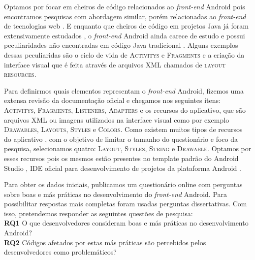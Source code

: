Optamos por focar em cheiros de código relacionados ao \textit{front-end} Android pois encontramos pesquisas com abordagem similar, por\'em relacionadas ao \textit{front-end} de tecnologias web \cite{CSSCodeSmell, BB, FinavaroAniche2016}. E enquanto que cheiros de c\'odigo em projetos Java j\'a foram extensivamente estudados \cite{Riel, Refactoring:99, Martin:2008:CCH:1388398}, o \textit{front-end} Android ainda carece de estudo e possui peculiaridades n\~ao encontradas em c\'odigo Java tradicional \cite{Mannan_Dig_Ahmed_Jensen_Abdullah_Almurshed}. Alguns exemplos dessas peculiaridas s\~ao o ciclo de vida de \textsc{Activitys} e \textsc{Fragments} e a cria\c{c}\~ao da interface visual que \'e feita atrav\'es de arquivos XML chamados de \textsc{layout resources}.

Para definirmos quais elementos representam o \textit{front-end} Android, fizemos uma extensa revis\~ao da documenta\c{c}\~ao oficial \cite{AndroidDeveloperSite2016} e chegamos nos seguintes itens: \textsc{Activitys}, \textsc{Fragments}, \textsc{Listeners}, \textsc{Adapters} e os recursos do aplicativo, que s\~ao arquivos XML ou imagens utilizados na interface visual como por exemplo \textsc{Drawables}, \textsc{Layouts}, \textsc{Styles} e \textsc{Colors}. Como existem muitos tipos de recursos do aplicativo \cite{AndroidResourcesOverview}, com o objetivo de limitar o tamanho do question\'ario e foco da pesquisa, selecionamos quatro: \textsc{Layout}, \textsc{Styles}, \textsc{String} e \textsc{Drawable}. Optamos por esses recursos pois os mesmos est\~ao presentes no template padr\~ao do Android Studio \cite{FirstApp2017}, IDE oficial para desenvolvimento de projetos da plataforma Android \cite{AndroidStudio}. 

Para obter os dados iniciais, publicamos um question\'ario online com perguntas sobre boas e m\'as pr\'aticas no desenvolvimento do \textit{front-end} Android. Para possibilitar respostas mais completas foram usadas perguntas dissertativas. Com isso, pretendemos responder as seguintes quest\~oes de pesquisa: \\

\textbf{RQ1} O que desenvolvedores consideram boas e m\'as pr\'aticas no desenvolvimento Android? \\

\textbf{RQ2} C\'odigos afetados por estas m\'as pr\'aticas s\~ao percebidos pelos desenvolvedores como problem\'aticos? \\


